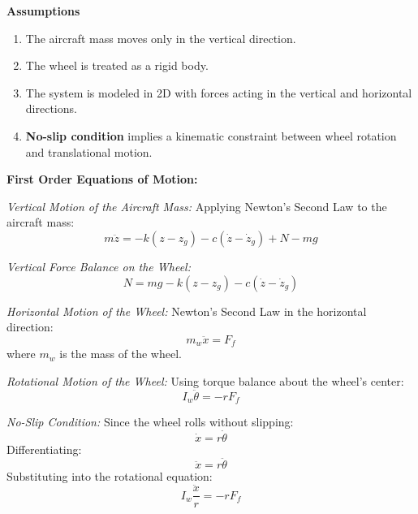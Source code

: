 \documentclass[12pt,letterpaper, onecolumn]{exam}
\begin{document}
\begin{questions}
\begin{solution}
\begin{parts}
        \textbf{Assumptions}
            \begin{enumerate}
                \item The aircraft mass moves only in the vertical direction.
                \item The wheel is treated as a rigid body.
                \item The system is modeled in 2D with forces acting in the vertical and horizontal directions.
                \item \textbf{No-slip condition} implies a kinematic constraint between wheel rotation and translational motion.
            \end{enumerate}

        \textbf{First Order Equations of Motion:}

        \vspace{5mm}
            \textit{Vertical Motion of the Aircraft Mass:}
                Applying Newton’s Second Law to the aircraft mass:
        \begin{equation}
            m\ddot{z} = -k(z - z_g) - c(\dot{z} - \dot{z}_g) + N - mg
        \end{equation}

        \textit{Vertical Force Balance on the Wheel:}
    \begin{equation}
        N = mg - k(z - z_g) - c(\dot{z} - \dot{z}_g)
    \end{equation}

        \textit{Horizontal Motion of the Wheel:}
            Newton’s Second Law in the horizontal direction:
    \begin{equation}
    m_w \ddot{x} = F_f
    \end{equation}
    where $m_w$ is the mass of the wheel.

    \textit{Rotational Motion of the Wheel:}
    Using torque balance about the wheel’s center:
    \begin{equation}
    I_w \ddot{\theta} = -r F_f
    \end{equation}

    \textit{No-Slip Condition:}
    Since the wheel rolls without slipping:
    \begin{equation}
    \dot{x} = r \dot{\theta}
    \end{equation}
    Differentiating:
    \begin{equation}
    \ddot{x} = r \ddot{\theta}
    \end{equation}
    Substituting into the rotational equation:
    \begin{equation}
    I_w \frac{\ddot{x}}{r} = -r F_f
    \end{equation}


\end{parts}
\end{solution}
\end{questions}
\end{document}
